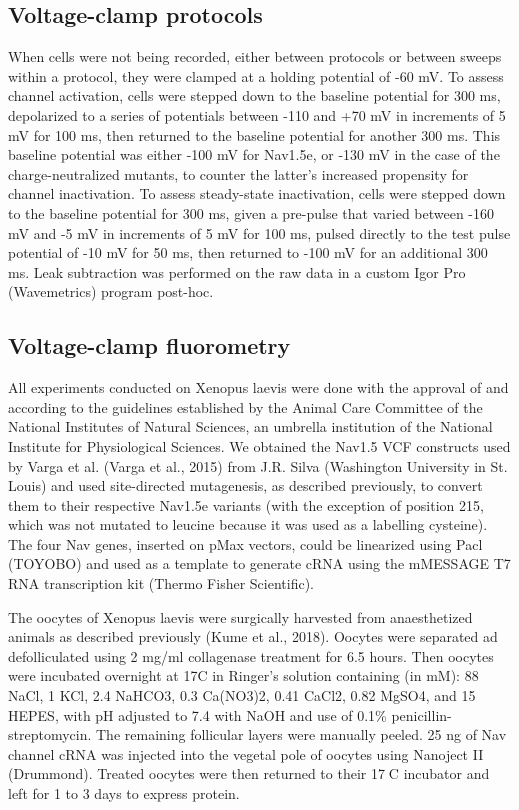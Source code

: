 \subsection{Voltage-clamp protocols}
When cells were not being recorded, either between protocols or between sweeps within a protocol, they were clamped at a holding potential of -60 mV. To assess channel activation, cells were stepped down to the baseline potential for 300 ms, depolarized to a series of potentials between -110 and +70 mV in increments of 5 mV for 100 ms, then returned to the baseline potential for another 300 ms. This baseline potential was either -100 mV for Nav1.5e, or -130 mV in the case of the charge-neutralized mutants, to counter the latter’s increased propensity for channel inactivation. To assess steady-state inactivation, cells were stepped down to the baseline potential for 300 ms, given a pre-pulse that varied between -160 mV and -5 mV in increments of 5 mV for 100 ms, pulsed directly to the test pulse potential of -10 mV for 50 ms, then returned to -100 mV for an additional 300 ms. Leak subtraction was performed on the raw data in a custom Igor Pro (Wavemetrics) program post-hoc. 

\subsection{Voltage-clamp fluorometry}
All experiments conducted on Xenopus laevis were done with the approval of and according to the guidelines established by the Animal Care Committee of the National Institutes of Natural Sciences, an umbrella institution of the National Institute for Physiological Sciences. We obtained the Nav1.5 VCF constructs used by Varga et al. (Varga et al., 2015) from J.R. Silva (Washington University in St. Louis) and used site-directed mutagenesis, as described previously, to convert them to their respective Nav1.5e variants (with the exception of position 215, which was not mutated to leucine because it was used as a labelling cysteine). The four Nav genes, inserted on pMax vectors, could be linearized using Pacl (TOYOBO) and used as a template to generate cRNA using the mMESSAGE T7 RNA transcription kit (Thermo Fisher Scientific). 

The oocytes of Xenopus laevis were surgically harvested from anaesthetized animals as described previously (Kume et al., 2018). Oocytes were separated ad defolliculated using 2 mg/ml collagenase treatment for 6.5 hours. Then oocytes were incubated overnight at 17\textdegree C in Ringer’s solution containing (in mM): 88 NaCl, 1 KCl, 2.4 NaHCO3, 0.3 Ca(NO3)2, 0.41 CaCl2, 0.82 MgSO4, and 15 HEPES, with pH adjusted to 7.4 with NaOH and use of 0.1\% penicillin-streptomycin. The remaining follicular layers were manually peeled. 25 ng of Nav channel cRNA was injected into the vegetal pole of oocytes using Nanoject II (Drummond). Treated oocytes were then returned to their 17C incubator and left for 1 to 3 days to express protein.

